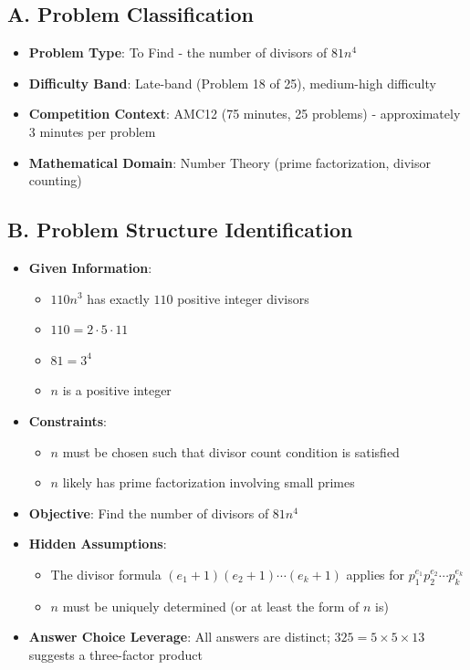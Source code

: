 \documentclass[]{article}
\begin{document}
\begin{problemconfigbox}
\subsection*{A. Problem Classification}
\begin{itemize}[leftmargin=*]
    \item \textbf{Problem Type}: To Find - the number of divisors of $81n^4$
    \item \textbf{Difficulty Band}: Late-band (Problem 18 of 25), medium-high difficulty
    \item \textbf{Competition Context}: AMC12 (75 minutes, 25 problems) - approximately 3 minutes per problem
    \item \textbf{Mathematical Domain}: Number Theory (prime factorization, divisor counting)
\end{itemize}

\subsection*{B. Problem Structure Identification}
\begin{itemize}[leftmargin=*]
    \item \textbf{Given Information}: 
    \begin{itemize}
        \item $110n^3$ has exactly $110$ positive integer divisors
        \item $110 = 2 \cdot 5 \cdot 11$
        \item $81 = 3^4$
        \item $n$ is a positive integer
    \end{itemize}
    \item \textbf{Constraints}: 
    \begin{itemize}
        \item $n$ must be chosen such that divisor count condition is satisfied
        \item $n$ likely has prime factorization involving small primes
    \end{itemize}
    \item \textbf{Objective}: Find the number of divisors of $81n^4$
    \item \textbf{Hidden Assumptions}: 
    \begin{itemize}
        \item The divisor formula $(e_1+1)(e_2+1)\cdots(e_k+1)$ applies for $p_1^{e_1}p_2^{e_2}\cdots p_k^{e_k}$
        \item $n$ must be uniquely determined (or at least the form of $n$ is)
    \end{itemize}
    \item \textbf{Answer Choice Leverage}: All answers are distinct; $325 = 5 \times 5 \times 13$ suggests a three-factor product
\end{itemize}


\end{problemconfigbox}
\end{document}
